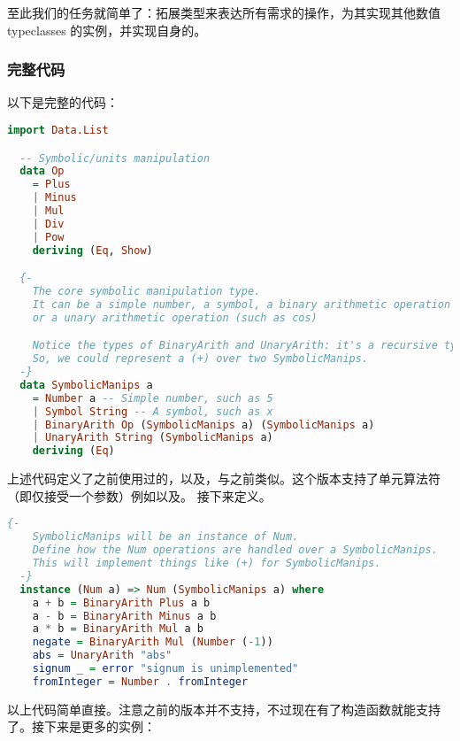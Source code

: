 \documentclass[./main.tex]{subfiles}
\begin{document}
至此我们的任务就简单了：拓展类型来表达所有需求的操作，为其实现其他数值 typeclasses 的实例，并实现自身的。

\subsubsection*{完整代码}

以下是完整的代码：

\begin{lstlisting}[language=Haskell]
  import Data.List

  -- Symbolic/units manipulation
  data Op
    = Plus
    | Minus
    | Mul
    | Div
    | Pow
    deriving (Eq, Show)

  {-
    The core symbolic manipulation type.
    It can be a simple number, a symbol, a binary arithmetic operation (such as +),
    or a unary arithmetic operation (such as cos)

    Notice the types of BinaryArith and UnaryArith: it's a recursive type.
    So, we could represent a (+) over two SymbolicManips.
  -}
  data SymbolicManips a
    = Number a -- Simple number, such as 5
    | Symbol String -- A symbol, such as x
    | BinaryArith Op (SymbolicManips a) (SymbolicManips a)
    | UnaryArith String (SymbolicManips a)
    deriving (Eq)
\end{lstlisting}

上述代码定义了之前使用过的，以及，与之前类似。这个版本支持了单元算法符（即仅接受一个参数）例如以及。
接下来定义。

\begin{lstlisting}[language=Haskell]
  {-
    SymbolicManips will be an instance of Num.
    Define how the Num operations are handled over a SymbolicManips.
    This will implement things like (+) for SymbolicManips.
  -}
  instance (Num a) => Num (SymbolicManips a) where
    a + b = BinaryArith Plus a b
    a - b = BinaryArith Minus a b
    a * b = BinaryArith Mul a b
    negate = BinaryArith Mul (Number (-1))
    abs = UnaryArith "abs"
    signum _ = error "signum is unimplemented"
    fromInteger = Number . fromInteger
\end{lstlisting}

以上代码简单直接。注意之前的版本并不支持，不过现在有了构造函数就能支持了。接下来是更多的实例：
\end{document}
